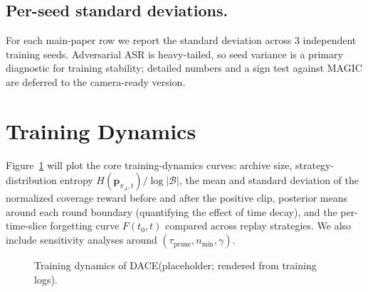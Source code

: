 \documentclass{article}
\newcommand{\method}{\textsc{DACE}\xspace}
\newcommand{\piA}{\pi_A}
\newcommand{\strategyspace}{\mathcal{B}}
\begin{document}
\subsection{Per-seed standard deviations.}
\label{apdx:bench-seed-std}

For each main-paper row we report the standard deviation across 3 independent training seeds. Adversarial ASR is heavy-tailed, so seed variance is a primary diagnostic for training stability; detailed numbers and a sign test against MAGIC are deferred to the camera-ready version.





\section{Training Dynamics}
\label{apdx:training-dynamics}

Figure~\ref{fig:training-dynamics} will plot the core training-dynamics curves: archive size, strategy-distribution entropy $H(\mathbf{p}_{\piA,t})/\log|\strategyspace|$, the mean and standard deviation of the normalized coverage reward before and after the positive clip, posterior means around each round boundary (quantifying the effect of time decay), and the per-time-slice forgetting curve $F(t_0, t)$ compared across replay strategies. We also include sensitivity analyses around $(\tau_{\mathrm{prune}}, n_{\min}, \gamma)$.

\begin{figure}[h]
  \centering
  \fbox{\rule[-2.5cm]{0pt}{5.0cm}\rule[-2.5cm]{0.95\linewidth}{0pt}}
  \caption{Training dynamics of \method (placeholder; rendered from training logs).}
  \label{fig:training-dynamics}
\end{figure}
\end{document}
